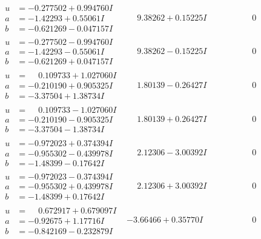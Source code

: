 \documentclass[1p]{elsarticle_modified}
\theoremstyle{definition}
\begin{document}
$$\begin{array}{c|c|c}
\begin{aligned}
u &= -0.277502 + 0.994760 I \\
a &= -1.42293 + 0.55061 I \\
b &= -0.621269 - 0.047157 I\end{aligned}
 & \phantom{-}9.38262 + 0.15225 I & \phantom{-0.000000 } 0 \\ \hline\begin{aligned}
u &= -0.277502 - 0.994760 I \\
a &= -1.42293 - 0.55061 I \\
b &= -0.621269 + 0.047157 I\end{aligned}
 & \phantom{-}9.38262 - 0.15225 I & \phantom{-0.000000 } 0 \\ \hline\begin{aligned}
u &= \phantom{-}0.109733 + 1.027060 I \\
a &= -0.210190 + 0.905325 I \\
b &= -3.37504 + 1.38734 I\end{aligned}
 & \phantom{-}1.80139 - 0.26427 I & \phantom{-0.000000 } 0 \\ \hline\begin{aligned}
u &= \phantom{-}0.109733 - 1.027060 I \\
a &= -0.210190 - 0.905325 I \\
b &= -3.37504 - 1.38734 I\end{aligned}
 & \phantom{-}1.80139 + 0.26427 I & \phantom{-0.000000 } 0 \\ \hline\begin{aligned}
u &= -0.972023 + 0.374394 I \\
a &= -0.955302 - 0.439978 I \\
b &= -1.48399 - 0.17642 I\end{aligned}
 & \phantom{-}2.12306 - 3.00392 I & \phantom{-0.000000 } 0 \\ \hline\begin{aligned}
u &= -0.972023 - 0.374394 I \\
a &= -0.955302 + 0.439978 I \\
b &= -1.48399 + 0.17642 I\end{aligned}
 & \phantom{-}2.12306 + 3.00392 I & \phantom{-0.000000 } 0 \\ \hline\begin{aligned}
u &= \phantom{-}0.672917 + 0.679097 I \\
a &= -0.92675 + 1.17716 I \\
b &= -0.842169 - 0.232879 I\end{aligned}
 & -3.66466 + 0.35770 I & \phantom{-0.000000 } 0 \\ \hline\begin{aligned}

\end{aligned}
\end{array}$$
\end{document}

